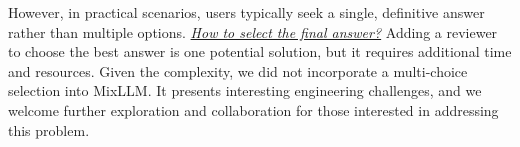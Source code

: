 However, in practical scenarios, users typically seek a single, definitive answer rather than multiple options. \ul{\textit{How to select the final answer?}} 
Adding a reviewer to choose the best answer is one potential solution, but it requires additional time and resources. Given the complexity, we did not incorporate a multi-choice selection into MixLLM. It presents interesting engineering challenges, and we welcome further exploration and collaboration for those interested in addressing this problem.



